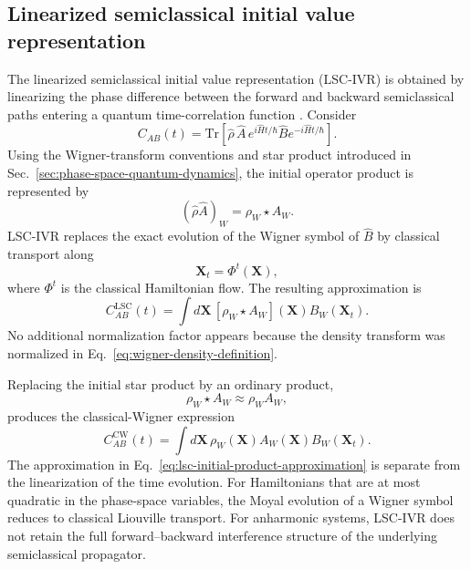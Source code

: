 \documentclass[
  11pt,
  letterpaper,
  onehalfspacing,
  normalmargins,
  equalmargins,
  oneside
]{ut-thesis}
\begin{document}
\subsection{Linearized semiclassical initial value representation}
\label{subsec:lsc-ivr}

The linearized semiclassical initial value representation (LSC-IVR) is
obtained by linearizing the phase difference between the forward and backward
semiclassical paths entering a quantum time-correlation function
\cite{Miller2001,Liu2015}. Consider
\begin{equation}
C_{AB}(t)
=
\mathrm{Tr}\left[
\hat\rho\,\hat A\,
 e^{i\hat Ht/\hbar}
\hat B
 e^{-i\hat Ht/\hbar}
\right].
\label{eq:quantum-correlation-function}
\end{equation}
Using the Wigner-transform conventions and star product introduced in
Sec.~\ref{sec:phase-space-quantum-dynamics}, the initial operator product is
represented by
\begin{equation}
(\hat\rho\hat A)_W
=
\rho_W\star A_W.
\label{eq:lsc-initial-star-product}
\end{equation}
LSC-IVR replaces the exact evolution of the Wigner symbol of \(\hat B\) by
classical transport along
\begin{equation}
\mathbf X_t=\Phi^t(\mathbf X),
\label{eq:lsc-classical-flow}
\end{equation}
where \(\Phi^t\) is the classical Hamiltonian flow. The resulting
approximation is
\begin{equation}
C_{AB}^{\mathrm{LSC}}(t)
=
\int d\mathbf X\,
\left[
\rho_W\star A_W
\right](\mathbf X)
B_W(\mathbf X_t).
\label{eq:lsc-ivr-correlation}
\end{equation}
No additional normalization factor appears because the density transform was
normalized in Eq.~\eqref{eq:wigner-density-definition}.

Replacing the initial star product by an ordinary product,
\begin{equation}
\rho_W\star A_W
\approx
\rho_WA_W,
\label{eq:lsc-initial-product-approximation}
\end{equation}
produces the classical-Wigner expression
\begin{equation}
C_{AB}^{\mathrm{CW}}(t)
=
\int d\mathbf X\,
\rho_W(\mathbf X)
A_W(\mathbf X)
B_W(\mathbf X_t).
\label{eq:classical-wigner-correlation}
\end{equation}
The approximation in Eq.~\eqref{eq:lsc-initial-product-approximation} is
separate from the linearization of the time evolution. For Hamiltonians that
are at most quadratic in the phase-space variables, the Moyal evolution of a
Wigner symbol reduces to classical Liouville transport. For anharmonic
systems, LSC-IVR does not retain the full forward--backward interference
structure of the underlying semiclassical propagator.
\end{document}
